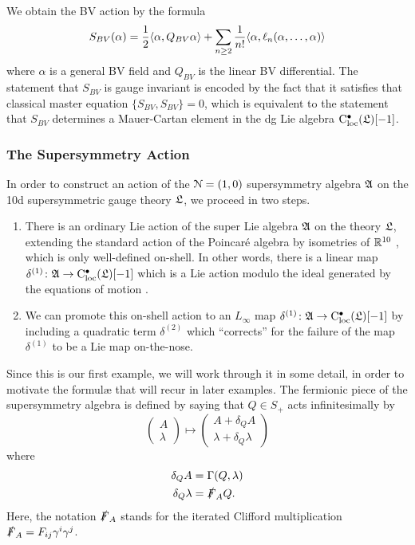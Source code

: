 \documentclass[10pt, oneside]{article}
\begin{document}
We obtain the BV action by the formula
\[
S_{BV} (\alpha) = \frac{1}{2} \langle\alpha , Q_{BV} \alpha\rangle + \sum_{n \geq 2} \frac{1}{n!} \langle\alpha, \ell_n(\alpha,\ldots, \alpha)\rangle 
\]
where $\alpha$ is a general BV field and $Q_{BV}$ is the linear BV differential. 
The statement that $S_{BV}$ is gauge invariant is encoded by the fact that it satisfies that classical master equation $\{S_{BV}, S_{BV}\} = 0$, which is equivalent to the statement that $S_{BV}$ determines a Mauer-Cartan element in the dg Lie algebra ${\rm C}_{\rm loc}^\bullet(\mathfrak L)[-1]$. 

\subsubsection{The Supersymmetry Action}
In order to construct an action of the $\mathcal{N}=(1,0)$ supersymmetry algebra $\mathfrak{A}$ on the 10d supersymmetric gauge theory $\mathfrak L$, we proceed in two steps.
\begin{enumerate}
 \item There is an ordinary Lie action of the super Lie algebra $\mathfrak{A}$ on the theory $\mathfrak L$, extending the standard action of the Poincar\'e algebra by isometries of $\mathbb R^{10}$ , which is only well-defined on-shell.  In other words, there is a linear map $\delta^{(1)} \colon \mathfrak{A} \to {\rm C}_{\rm loc}^\bullet(\mathfrak L)[-1]$ which is a Lie action modulo the ideal generated by the equations of motion .
 \item We can promote this on-shell action to an $L_\infty$ map $\delta^{(1)} \colon \mathfrak{A} \to {\rm C}_{\rm loc}^\bullet(\mathfrak L)[-1]$ by including a quadratic term $\delta^{(2)}$ which ``corrects'' for the failure of the map $\delta^{(1)}$ to be a Lie map on-the-nose.
\end{enumerate}

Since this is our first example, we will work through it in some detail, in order to motivate the formul\ae{} that will recur in later examples.  The fermionic piece of the supersymmetry algebra is defined by saying that $Q \in S_+$ acts infinitesimally by
\[
\begin{pmatrix}
A \\ \lambda
\end{pmatrix}
\mapsto
\begin{pmatrix} A + \delta_Q A \\
\lambda + \delta_Q \lambda
\end{pmatrix}
\]
where 
\begin{align*}
\delta_Q A &= \Gamma(Q,\lambda) \\
\delta_Q \lambda &= \slashed{F}_A Q .
\end{align*}
Here, the notation $\slashed{F}_A$ stands for the iterated Clifford multiplication $\slashed{F}_A = F_{ij} \gamma^i \gamma^j$. 
\end{document}
